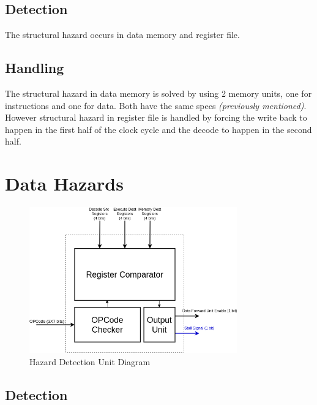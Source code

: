 \documentclass[12pt]{report}
\begin{document}
\subsection{Detection}
The structural hazard occurs in data memory and register file.

\subsection{Handling}
The structural hazard in data memory is solved by using 2 memory units, one for instructions and one for data. Both have the same specs \emph{(previously mentioned)}. \\
However structural hazard in register file is handled by forcing the write back to happen in the first half of the clock cycle and the decode to happen in the second half.

\section{Data Hazards}
\begin{center}
    \begin{figure}[hp]
        \centering
        \includegraphics[width=0.8\textwidth]{hdu}
        \caption{Hazard Detection Unit Diagram}
        \label{fig:hdu}
    \end{figure}
\end{center}

\subsection{Detection}
\end{document}
